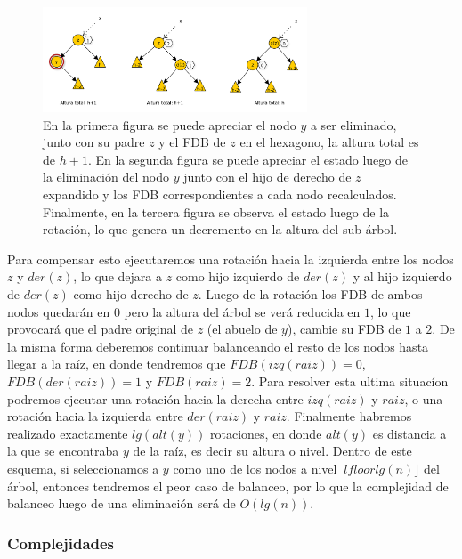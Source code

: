 \documentclass[10pt, a4paper]{report}
\begin{document}
\begin{figure}
 \centering
 \includegraphics[width=0.70\textwidth]{PeorCasoEliminacionAVL.pdf}
 \caption*{\newline \footnotesize En la primera figura se puede apreciar el nodo $y$ a ser eliminado, junto con su padre $z$ y el FDB de $z$ en el hexagono, la altura total es de $h+1$. En la segunda figura se puede apreciar el estado luego de la eliminaci\'on del nodo $y$ junto con el hijo de derecho de $z$ expandido y los FDB correspondientes a cada nodo recalculados. Finalmente, en la tercera figura se observa el estado luego de la rotaci\'on, lo que genera un decremento en la altura del sub-\'arbol.}
\end{figure}

Para compensar esto ejecutaremos una rotaci\'on hacia la izquierda entre los nodos $z$ y $der(z)$, lo que dejara a $z$ como hijo izquierdo de $der(z)$ y al hijo izquierdo de $der(z)$ como hijo derecho de $z$. Luego de la rotaci\'on los FDB de ambos nodos quedar\'an en $0$ pero la altura del \'arbol se ver\'a reducida en $1$, lo que provocar\'a que el padre original de $z$ (el abuelo de $y$), cambie su FDB de $1$ a $2$. De la misma forma deberemos continuar balanceando el resto de los nodos hasta llegar a la ra\'iz, en donde tendremos que $FDB(izq(raiz)) = 0$, $FDB(der(raiz)) = 1$ y $FDB(raiz) = 2$. Para resolver esta ultima situac\'ion podremos ejecutar una rotaci\'on hacia la derecha entre $izq(raiz)$ y $raiz$, o una rotaci\'on hacia la izquierda entre $der(raiz)$ y $raiz$. Finalmente habremos realizado exactamente $lg(alt(y))$ rotaciones, en donde $alt(y)$ es distancia a la que se encontraba $y$ de la ra\'iz, es decir su altura o nivel. Dentro de este esquema, si seleccionamos a $y$ como uno de los nodos a 
nivel $\
lfloor lg(n) \rfloor$ del \'arbol, entonces tendremos el peor caso de balanceo, por lo que la complejidad de balanceo luego de una eliminaci\'on ser\'a de $O(lg(n))$.

\subsubsection{Complejidades}
\end{document}
